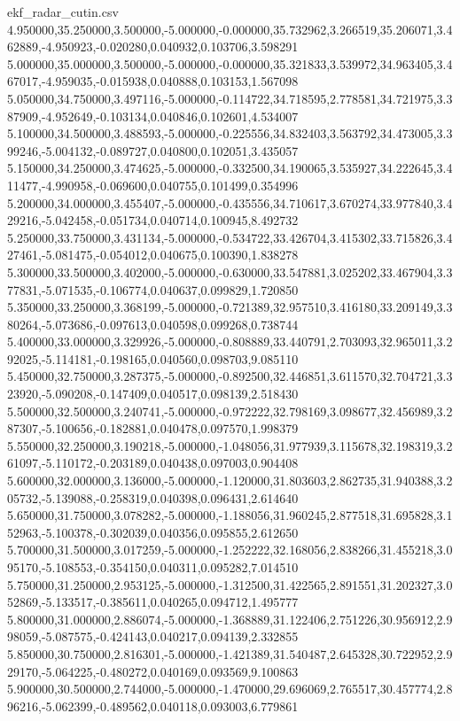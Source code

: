 \begin{filecontents*}[overwrite]{ekf_radar_cutin.csv}
4.950000,35.250000,3.500000,-5.000000,-0.000000,35.732962,3.266519,35.206071,3.462889,-4.950923,-0.020280,0.040932,0.103706,3.598291
5.000000,35.000000,3.500000,-5.000000,-0.000000,35.321833,3.539972,34.963405,3.467017,-4.959035,-0.015938,0.040888,0.103153,1.567098
5.050000,34.750000,3.497116,-5.000000,-0.114722,34.718595,2.778581,34.721975,3.387909,-4.952649,-0.103134,0.040846,0.102601,4.534007
5.100000,34.500000,3.488593,-5.000000,-0.225556,34.832403,3.563792,34.473005,3.399246,-5.004132,-0.089727,0.040800,0.102051,3.435057
5.150000,34.250000,3.474625,-5.000000,-0.332500,34.190065,3.535927,34.222645,3.411477,-4.990958,-0.069600,0.040755,0.101499,0.354996
5.200000,34.000000,3.455407,-5.000000,-0.435556,34.710617,3.670274,33.977840,3.429216,-5.042458,-0.051734,0.040714,0.100945,8.492732
5.250000,33.750000,3.431134,-5.000000,-0.534722,33.426704,3.415302,33.715826,3.427461,-5.081475,-0.054012,0.040675,0.100390,1.838278
5.300000,33.500000,3.402000,-5.000000,-0.630000,33.547881,3.025202,33.467904,3.377831,-5.071535,-0.106774,0.040637,0.099829,1.720850
5.350000,33.250000,3.368199,-5.000000,-0.721389,32.957510,3.416180,33.209149,3.380264,-5.073686,-0.097613,0.040598,0.099268,0.738744
5.400000,33.000000,3.329926,-5.000000,-0.808889,33.440791,2.703093,32.965011,3.292025,-5.114181,-0.198165,0.040560,0.098703,9.085110
5.450000,32.750000,3.287375,-5.000000,-0.892500,32.446851,3.611570,32.704721,3.323920,-5.090208,-0.147409,0.040517,0.098139,2.518430
5.500000,32.500000,3.240741,-5.000000,-0.972222,32.798169,3.098677,32.456989,3.287307,-5.100656,-0.182881,0.040478,0.097570,1.998379
5.550000,32.250000,3.190218,-5.000000,-1.048056,31.977939,3.115678,32.198319,3.261097,-5.110172,-0.203189,0.040438,0.097003,0.904408
5.600000,32.000000,3.136000,-5.000000,-1.120000,31.803603,2.862735,31.940388,3.205732,-5.139088,-0.258319,0.040398,0.096431,2.614640
5.650000,31.750000,3.078282,-5.000000,-1.188056,31.960245,2.877518,31.695828,3.152963,-5.100378,-0.302039,0.040356,0.095855,2.612650
5.700000,31.500000,3.017259,-5.000000,-1.252222,32.168056,2.838266,31.455218,3.095170,-5.108553,-0.354150,0.040311,0.095282,7.014510
5.750000,31.250000,2.953125,-5.000000,-1.312500,31.422565,2.891551,31.202327,3.052869,-5.133517,-0.385611,0.040265,0.094712,1.495777
5.800000,31.000000,2.886074,-5.000000,-1.368889,31.122406,2.751226,30.956912,2.998059,-5.087575,-0.424143,0.040217,0.094139,2.332855
5.850000,30.750000,2.816301,-5.000000,-1.421389,31.540487,2.645328,30.722952,2.929170,-5.064225,-0.480272,0.040169,0.093569,9.100863
5.900000,30.500000,2.744000,-5.000000,-1.470000,29.696069,2.765517,30.457774,2.896216,-5.062399,-0.489562,0.040118,0.093003,6.779861

\end{filecontents*}
